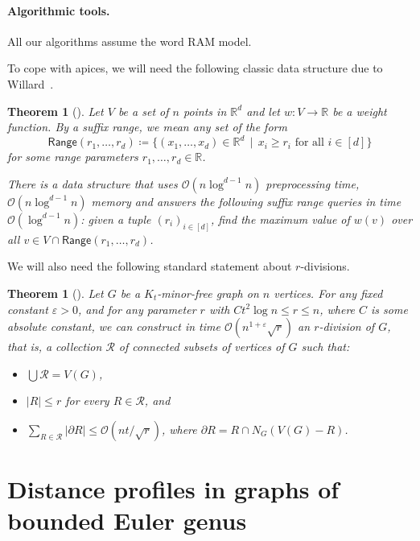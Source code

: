 \documentclass[11pt,a4paper]{article}
\newtheorem{theorem}[lemma]{Theorem}
\newcommand{\Oh}{\mathcal{O}}
\renewcommand{\leq}{\leqslant}
\renewcommand{\geq}{\geqslant}
\renewcommand{\setminus}{-}
\begin{document}
\paragraph{Algorithmic tools.}
All our algorithms assume the word RAM model.

To cope with apices, we will need the following classic data structure due to Willard~\cite{Willard85}.
\begin{theorem}[\cite{Willard85}]\label{t:orth_query}
Let $V$ be a set of $n$ points in $\mathbb{R}^d$ and let $w\colon V \to \mathbb{R}$ be a weight function. By a \emph{suffix range}, we mean any set of the form
$$\mathsf{Range}(r_1,\ldots,r_d)\coloneqq \{ (x_1, \dots, x_d) \in \mathbb{R}^d\,\mid\,x_i \geq r_i\textrm{ for all }i\in [d] \}$$ for some range parameters $r_1,\ldots,r_d\in \mathbb{R}$.

There is a data structure that uses $\Oh\left(n \log^{d - 1} n \right)$ preprocessing time, $\Oh\left( n \log^{d - 1} n \right)$ memory and answers the following suffix range queries in time $\Oh \left( \log^{d - 1} n \right)$:
given a tuple $(r_i)_{i \in [d]}$, find the maximum value of $w(v)$ over all
$v \in V\cap \mathsf{Range}(r_1,\ldots,r_d)$.
\end{theorem}

We will also need the following standard statement about $r$-divisions.

\begin{theorem}[\cite{WulffNilsen11}]\label{t:r_division}
Let $G$ be a $K_t$-minor-free graph on $n$ vertices. For any fixed constant $\varepsilon > 0$, and for any parameter $r$ with $C t^2 \log n\leq r\leq  n$, where $C$ is some absolute constant, we can construct in time $\Oh \left( n^{1 + \varepsilon} \sqrt{r} \right)$ an $r$-division of $G$, that is, a collection $\mathcal{R}$ of connected subsets of vertices of $G$ such that:
\begin{itemize}[nosep]
\item $\bigcup \mathcal{R}=V(G)$,
\item $|R| \leq r$ for every $R \in \mathcal{R}$, and
\item $\sum_{R \in \mathcal{R}} |\partial R| \leq \Oh(nt / \sqrt{r})$,
where $\partial R = R \cap N_G(V(G) \setminus R)$.
\end{itemize}
\end{theorem}


 
\section{Distance profiles in graphs of bounded Euler genus}\label{sec:distprofiles}
\end{document}
